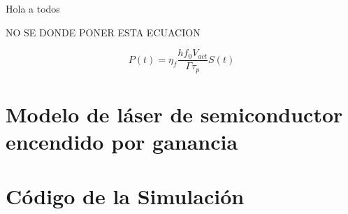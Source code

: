 Hola a todos

NO SE DONDE PONER ESTA ECUACION

	\begin{equation}
		P(t) = \eta_f \frac{h f_0 V_{act}}{\Gamma \tau_p} S(t)
		\label{eq:Power}
	\end{equation}
	

	\section{Modelo de l\'aser de semiconductor encendido por ganancia}
		\label{Mdl:RoF}
	

	\section{Código de la Simulación}
		\label{Mdl:Code}
	
		
	
